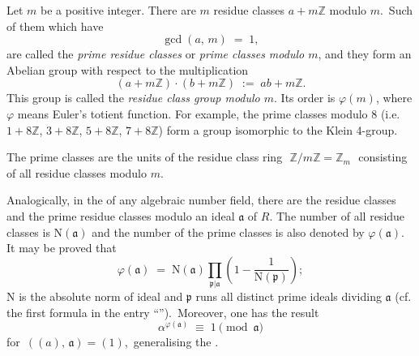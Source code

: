 \documentclass[12pt]{article}
\theoremstyle{definition}
\begin{document}
Let $m$ be a positive integer.  There are $m$ residue classes $a\!+\!m\mathbb{Z}$ modulo $m$.\, Such of them which have
                          $$\gcd(a,\,m) \;=\; 1,$$
are called the {\em prime residue classes} or {\em prime classes modulo $m$}, and they form an Abelian group with respect to the multiplication
   $$(a\!+\!m\mathbb{Z})\!\cdot\!(b\!+\!m\mathbb{Z}) \;:=\; ab\!+\!m\mathbb{Z}.$$
This group is called the {\em residue class group modulo $m$}.  Its order is $\varphi(m)$, where $\varphi$ means Euler's totient function.  For example, the prime classes modulo 8 (i.e. $1\!+\!8\mathbb{Z}$, $3\!+\!8\mathbb{Z}$, $5\!+\!8\mathbb{Z}$, $7\!+\!8\mathbb{Z}$) form a group isomorphic to the Klein 4-group.

The prime classes are the units of the residue class ring \,\,$\mathbb{Z}/m\mathbb{Z} = \mathbb{Z}_m$\,\, consisting of all residue classes modulo $m$.

Analogically, in the  of any algebraic number field, there are the residue classes and the prime residue classes modulo an ideal $\mathfrak{a}$ of $R$.  The number of all residue classes is 
$\mbox{N}(\mathfrak{a})$ and the number of the prime classes is also denoted by $\varphi(\mathfrak{a})$.\, It may be proved that
 $$\varphi(\mathfrak{a}) \;=\; 
\mbox{N}(\mathfrak{a})\prod_{\mathfrak{p}|\mathfrak{a}}\left(1-\frac{1}{\mbox{N}(\mathfrak{p})}\right);$$
$\mbox{N}$ is the absolute norm of ideal and $\mathfrak{p}$ runs all distinct prime ideals dividing $\mathfrak{a}$ (cf. the first formula in the entry ``'').\, Moreover, one has the result 
 $$\alpha^{\varphi(\mathfrak{a})} \;\equiv\; 1 \pmod{\mathfrak{a}}$$
for\, $((a),\,\mathfrak{a}) = (1)$,\, generalising the .
\end{document}
